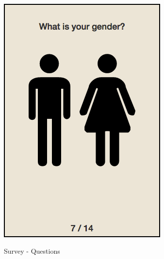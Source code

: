 \begin{figure}[H]
{        \includegraphics[scale=0.3]{pics/survey/gender}
      }
      \caption{Survey - Questions}
    \end{figure}

